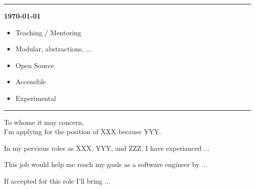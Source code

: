 




\hrule
\vspace{3em}
\begin{flushright}
\bf\today
\end{flushright}


\begin{itemize}
    \item Teaching / Mentoring
    \item Modular, abstractions, ...
    \item Open Source
    \item Accessible
    \item Experimental
\end{itemize}

\hrule
\vspace{3em}

\noindent To whome it may concern,
\vspace{1.5em} \\

I'm applying for the position of XXX because YYY.

In my pervious roles as XXX, YYY, and ZZZ, I have experianced ...

This job would help me reach my goals as a software engineer by ...

If accepted for this role I'll bring ...



